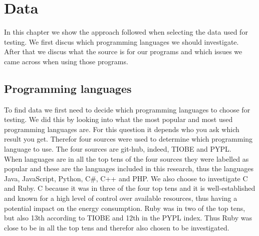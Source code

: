 \chapter{Data}
\label{ch:data}
In this chapter we show the approach followed when selecting the data used for testing. We first discus which programming languages we should investigate. After that we discus what the source is for our programs and which issues we came across when using those programs. 

\section{Programming languages}
To find data we first need to decide which programming languages to choose for testing. We did this by looking into what the most popular and most used programming languages are. For this question it depends who you ask which result you get. Therefor four sources were used to determine which programming language to use. The four sources are git-hub, indeed, TIOBE and PYPL.\\

When languages are in all the top tens of the four sources they were labelled as popular and these are the languages included in this research, thus the languages Java, JavaScript, Python, C\#, C++ and PHP. We also choose to investigate C and Ruby. C because it was in three of the four top tens and it is well-established and known for a high level of control over available resources, thus having a potential impact on the energy consumption. Ruby was in two of the top tens, but also 13th according to TIOBE and 12th in the PYPL index. Thus Ruby was close to be in all the top tens and therefor also chosen to be investigated.


%

